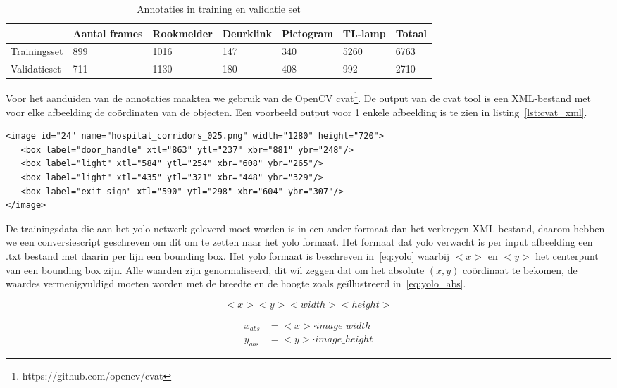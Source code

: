 \begin{table}[h]
    \caption{Annotaties in training en validatie set}\label{tab:annotaties}
    \begin{tabular}{l | l | l | l | l | l | l}
        & Aantal frames & Rookmelder & Deurklink & Pictogram & TL-lamp & Totaal \\ \hline
        Trainingsset & 899 & 1016 & 147 & 340 & 5260 & 6763 \\
        Validatieset & 711 & 1130 & 180 & 408 & 992 & 2710 \\
    \end{tabular}
\end{table}

Voor het aanduiden van de annotaties maakten we gebruik van de OpenCV \gls{cvat}\footnote{https://github.com/opencv/cvat}.
De output van de \gls{cvat} tool is een XML-bestand met voor elke afbeelding de co\"{o}rdinaten van de objecten. Een voorbeeld output voor 1 enkele afbeelding is te zien in listing~\ref{lst:cvat_xml}.

   \begin{lstlisting}[basicstyle=\small]
<image id="24" name="hospital_corridors_025.png" width="1280" height="720">
   <box label="door_handle" xtl="863" ytl="237" xbr="881" ybr="248"/>
   <box label="light" xtl="584" ytl="254" xbr="608" ybr="265"/>
   <box label="light" xtl="435" ytl="321" xbr="448" ybr="329"/>
   <box label="exit_sign" xtl="590" ytl="298" xbr="604" ybr="307"/>
</image>
   \end{lstlisting}

De trainingsdata die aan het \gls{yolo} netwerk geleverd moet worden is in een ander formaat dan het verkregen XML bestand, daarom hebben we een conversiescript geschreven om dit om te zetten naar het \gls{yolo} formaat.
Het formaat dat \gls{yolo} verwacht is per input afbeelding een .txt bestand met daarin per lijn een bounding box. Het \gls{yolo} formaat is beschreven in~\ref{eq:yolo} waarbij $<x>$ en $<y>$ het centerpunt van een bounding box zijn.
Alle waarden zijn genormaliseerd, dit wil zeggen dat om het absolute $(x, y)$ co\"{o}rdinaat te bekomen, de waardes vermenigvuldigd moeten worden met de breedte en de hoogte zoals ge\"{i}llustreerd in~\ref{eq:yolo_abs}.

\begin{equation} \label{eq:yolo}
  <x> <y> <width> <height>
\end{equation}

\begin{equation} \label{eq:yolo_abs}
    \begin{split}
        x_{abs} &= <x> \cdot  image\_width \\
        y_{abs} &= <y> \cdot image\_height
    \end{split}
\end{equation}


